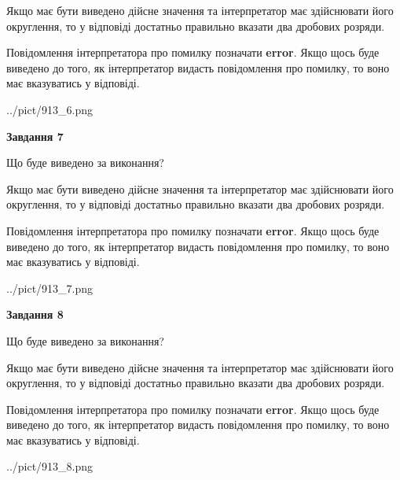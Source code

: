 \documentclass[12pt, ukrainian]{article}
\begin{document}
{\begin {Large}
Якщо має бути виведено дійсне значення та інтерпретатор має здійснювати його округлення, 
то у відповіді достатньо правильно вказати два дробових розряди.

Повідомлення інтерпретатора про помилку позначати \textbf{error}.
Якщо щось буде виведено до того, як інтерпретатор видасть повідомлення про помилку, 
то воно має вказуватись у відповіді. \par

\begin{center}
	{../pict/913_6.png}
\end{center}
\newpage

{\begin {center}\textbf{Завдання 7}\end {center}}\par
Що буде виведено за виконання? \par

Якщо має бути виведено дійсне значення та інтерпретатор має здійснювати його округлення, 
то у відповіді достатньо правильно вказати два дробових розряди.

Повідомлення інтерпретатора про помилку позначати \textbf{error}.
Якщо щось буде виведено до того, як інтерпретатор видасть повідомлення про помилку, 
то воно має вказуватись у відповіді. \par

\begin{center}
	{../pict/913_7.png}
\end{center}
\newpage

{\begin {center}\textbf{Завдання 8}\end {center}}\par
Що буде виведено за виконання? \par

Якщо має бути виведено дійсне значення та інтерпретатор має здійснювати його округлення, 
то у відповіді достатньо правильно вказати два дробових розряди.

Повідомлення інтерпретатора про помилку позначати \textbf{error}.
Якщо щось буде виведено до того, як інтерпретатор видасть повідомлення про помилку, 
то воно має вказуватись у відповіді. \par

\begin{center}
	{../pict/913_8.png}
\end{center}
\newpage


\end{Large}}
\end{document}
